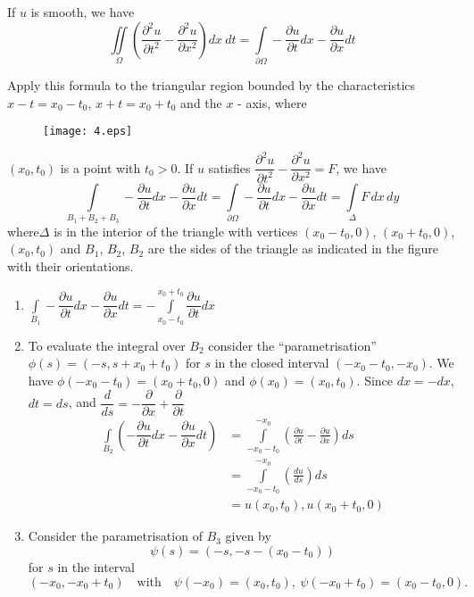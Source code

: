 \begin{coro*}
If $u$ is smooth, we have
$$
\iint\limits_{\Omega}\left(\frac{\partial^{2}u}{\partial t^{2}}-\frac{\partial^{2}u}{\partial x^{2}}\right)dx \ dt = \int\limits_{\partial\Omega}-\frac{\partial u}{\partial t}dx-\frac{\partial u}{\partial x}dt
$$

Apply this formula to the triangular region bounded by the characteristics $x-t=x_{0}-t_{0}$, $x+t=x_{0}+t_{0}$ and the $x$ - axis, where
\begin{figure}[H]
\centering
\texttt{[image: 4.eps]}
\end{figure}
\noindent
$(x_{0},t_{0})$ is a point with $t_{0}>0$. If $u$ satisfies $\dfrac{\partial^{2}u}{\partial t^{2}}-\dfrac{\partial^{2}u}{\partial x^{2}}=F$, we have
$$
\int\limits_{B_{1}+B_{2}+B_{3}}-\frac{\partial u}{\partial t}dx-\dfrac{\partial u}{\partial x}dt=\int\limits_{\partial \Omega}-\frac{\partial u}{\partial t}dx-\dfrac{\partial u}{\partial x}dt=\int\limits_{\Delta} F\,dx\,dy
$$
where\pageoriginale $\Delta$ is in the interior of the triangle with vertices $(x_{0}-t_{0},0)$, $(x_{0}+t_{0},0)$, $(x_{0},t_{0})$ and $B_{1}$, $B_{2}$, $B_{2}$ are the sides of the triangle as indicated in the figure with their orientations.
\begin{enumerate}
\renewcommand{\labelenumi}{\rm(\theenumi)}
\item $\int\limits_{B_{1}}-\dfrac{\partial u}{\partial t}dx-\dfrac{\partial u}{\partial x}dt=-\int\limits^{x_{0}+t_{0}}_{x_{0}-t_{0}}\dfrac{\partial u}{\partial t}dx$

\item To evaluate the integral over $B_{2}$ consider the ``parametrisation'' $\phi(s)=(-s,s+x_{0}+t_{0})$ for $s$ in the closed interval $(-x_{0}-t_{0},-x_{0})$. We have $\phi(-x_{0}-t_{0})=(x_{0}+t_{0},0)$ and $\phi(x_{0})=(x_{0},t_{0})$. Since $dx=-dx$, $dt=ds$, and $\dfrac{d}{ds}=-\dfrac{\partial}{\partial x}+\dfrac{\partial}{\partial t}$
\begin{align*}
\int\limits_{B_{2}} \left(-\dfrac{\partial u}{\partial t}dx-\dfrac{\partial u}{\partial x}dt\right) &= \int\limits^{-x_{0}}_{-x_{0}-t_{0}}\left(\frac{\partial u}{\partial t}-\frac{\partial u}{\partial x}\right)ds\\[4pt]
&= \int\limits^{-x_{0}}_{-x_{0}-t_{0}}\left(\frac{du}{ds}\right)ds\\[4pt]
&= u(x_{0},t_{0}), u(x_{0}+t_{0},0)
\end{align*}

\item Consider the parametrisation of $B_{3}$ given by
$$
\psi(s)=(-s,-s-(x_{0}-t_{0}))
$$
for $s$ in the interval
$$
(-x_{0},-x_{0}+t_{0})\quad\text{with}\quad \psi(-x_{0})=(x_{0},t_{0}), \ \psi(-x_{0}+t_{0})=(x_{0}-t_{0},0).
$$


\end{enumerate}
\end{coro*}
